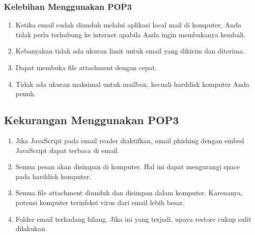 \subsubsection {Kelebihan Menggunakan POP3}
	\begin{enumerate}
		\item Ketika email sudah diunduh melalui aplikasi local mail di komputer, Anda tidak perlu terhubung ke internet apabila Anda ingin membukanya kembali. 
		\item Kebanyakan tidak ada ukuran limit untuk email yang dikirim dan diterima. 
		\item Dapat membuka ﬁle attachment dengan cepat.
		\item Tidak ada ukuran maksimal untuk mailbox, kecuali harddisk komputer Anda penuh.
	\end{enumerate}
	
\subsection {Kekurangan Menggunakan POP3} 
	\begin{enumerate}
		\item Jika JavaScript pada email reader diaktifkan, email phishing dengan embed JavaScript dapat terbaca di email. 
		\item Semua pesan akan disimpan di komputer. Hal ini dapat mengurangi space pada harddisk komputer.
		\item Semua file attachment diunduh dan disimpan dalam komputer. Karenanya, potensi komputer terinfeksi virus dari email lebih besar. \item Folder email terkadang hilang. Jika ini yang terjadi, upaya restore cukup sulit dilakukan.
	\end{enumerate}

